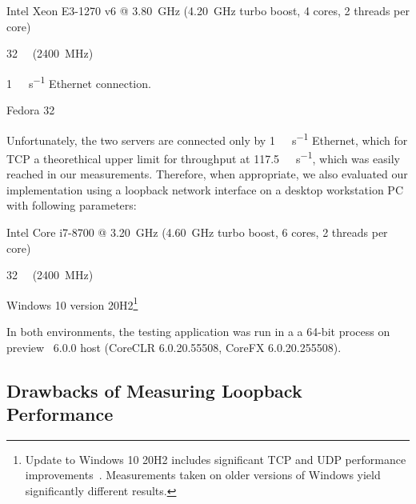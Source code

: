 \begin{itemize}

         Intel\textsuperscript{\textregistered{}} Xeon\textsuperscript{\textregistered{}}
        E3-1270 v6 @ \SI{3.80}{\giga\hertz} (\SI{4.20}{\giga\hertz} turbo boost, 4 cores, 2 threads
        per core)

         \SI{32}{\giga\byte} (\SI{2400}{\mega\hertz})

         \SI[per-mode=symbol]{1}{\giga\bit\per\second} Ethernet connection.

         Fedora 32

\end{itemize}

Unfortunately, the two servers are connected only by \SI[per-mode=symbol]{1}{\giga\bit\per\second}
Ethernet, which for TCP a theorethical upper limit for throughput at
\SI[per-mode=symbol]{117.5}{\mega\byte\per\second}, which was easily reached in our measurements.
Therefore, when appropriate, we also evaluated our implementation using a loopback network interface
on a desktop workstation PC with following parameters:

\begin{itemize}

         Intel\textsuperscript{\textregistered{}} Core\textsuperscript{\textregistered{}}
        i7-8700 @ \SI{3.20}{\giga\hertz} (\SI{4.60}{\giga\hertz} turbo boost, 6 cores, 2 threads per
        core)

         \SI{32}{\giga\byte} (\SI{2400}{\mega\hertz})

         Windows 10 version 20H2\footnote{Update to Windows 10 20H2 includes significant
        TCP and UDP performance improvements~\cite{theregister20h2}. Measurements taken on older
        versions of Windows yield significantly different results.}

\end{itemize}

In both environments, the testing application was run in a a 64-bit process on preview
\dotnet{}~6.0.0 host (CoreCLR 6.0.20.55508, CoreFX 6.0.20.255508).

\subsection{Drawbacks of Measuring Loopback Performance}\label{sec:04-localhost-mtu}


